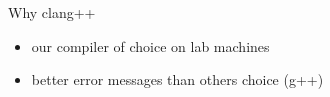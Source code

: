 \begin{frame}{Why clang++}
\begin{itemize}
\item our compiler of choice on lab machines
\item better error messages than others choice (g++)
\end{itemize}
\end{frame}

